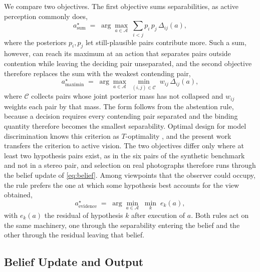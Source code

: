 \documentclass{article} %
\theoremstyle{defstyle}
\theoremstyle{plain}
\begin{document}
We compare two objectives. The first objective sums separabilities, as active perception
commonly does,
\begin{equation}
\label{eq:sum}
a^{\star}_{\text{sum}} \;=\; \arg\max_{a \in \mathcal{A}}
\;\sum_{i<j} p_i\, p_j\, \Delta_{ij}(a),
\end{equation}
where the posteriors $p_i, p_j$ let still-plausible pairs contribute more. Such a sum,
however, can reach its maximum at an action that separates pairs outside contention while
leaving the deciding pair unseparated, and the second objective therefore replaces the sum
with the weakest contending pair,
\begin{equation}
\label{eq:maximin}
a^{\star}_{\text{maximin}} \;=\; \arg\max_{a \in \mathcal{A}}
\;\min_{(i,j) \in \mathcal{C}} \; w_{ij}\, \Delta_{ij}(a),
\end{equation}
where $\mathcal{C}$ collects pairs whose joint posterior mass has not collapsed and
$w_{ij}$ weights each pair by that mass. The form follows from the abstention rule, because
a decision requires every contending pair separated and the binding quantity therefore
becomes the smallest separability. Optimal design for model discrimination knows this
criterion as $T$-optimality \citep{atkinson1975design,hunter1965experimental}, and the
present work transfers the criterion to active vision. The two objectives differ only where
at least two hypothesis pairs exist, as in the six pairs of the synthetic benchmark and not
in a stereo pair, and selection on real photographs therefore runs through the belief update
of \eqref{eq:belief}. Among viewpoints that the observer could occupy, the rule prefers the
one at which some hypothesis best accounts for the view obtained,
\begin{equation}
\label{eq:evidence-selection}
a^{\star}_{\text{evidence}} \;=\; \arg\min_{a \in \mathcal{A}} \;
\min_{k} \; e_k(a),
\end{equation}
with $e_k(a)$ the residual of hypothesis $k$ after execution of $a$. Both rules act on the
same machinery, one through the separability entering the belief and the other through the
residual leaving that belief.

\subsection{Belief Update and Output}
\label{sec:belief}
\end{document}
